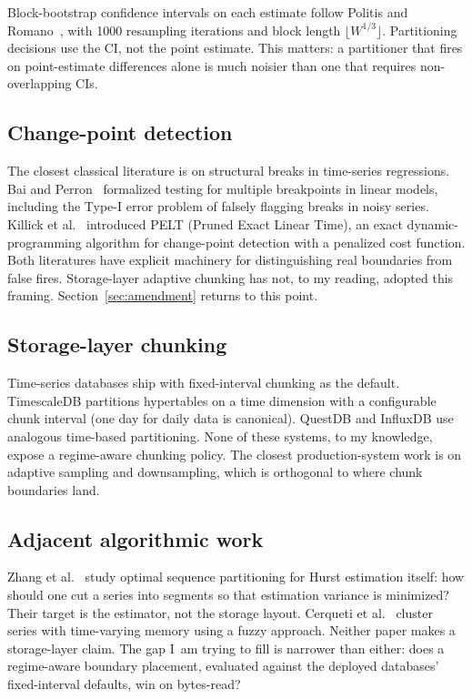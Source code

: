 \documentclass[11pt]{article}
\begin{document}
Block-bootstrap confidence intervals on each estimate follow Politis and Romano~\cite{politisromano1994}, with 1000 resampling iterations and block length $\lfloor W^{1/3}\rfloor$. Partitioning decisions use the CI, not the point estimate. This matters: a partitioner that fires on point-estimate differences alone is much noisier than one that requires non-overlapping CIs.

\subsection{Change-point detection}

The closest classical literature is on structural breaks in time-series regressions. Bai and Perron~\cite{baiperron1998} formalized testing for multiple breakpoints in linear models, including the Type-I error problem of falsely flagging breaks in noisy series. Killick et al.~\cite{killick2012pelt} introduced PELT (Pruned Exact Linear Time), an exact dynamic-programming algorithm for change-point detection with a penalized cost function. Both literatures have explicit machinery for distinguishing real boundaries from false fires. Storage-layer adaptive chunking has not, to my reading, adopted this framing. Section~\ref{sec:amendment} returns to this point.

\subsection{Storage-layer chunking}

Time-series databases ship with fixed-interval chunking as the default. TimescaleDB partitions hypertables on a time dimension with a configurable chunk interval (one day for daily data is canonical). QuestDB and InfluxDB use analogous time-based partitioning. None of these systems, to my knowledge, expose a regime-aware chunking policy. The closest production-system work is on adaptive sampling and downsampling, which is orthogonal to where chunk boundaries land.

\subsection{Adjacent algorithmic work}

Zhang et al.~\cite{zhang2023partitioning} study optimal sequence partitioning for Hurst estimation itself: how should one cut a series into segments so that estimation variance is minimized? Their target is the estimator, not the storage layout. Cerqueti et al.~\cite{cerqueti2022fuzzy} cluster series with time-varying memory using a fuzzy approach. Neither paper makes a storage-layer claim. The gap I~am trying to fill is narrower than either: does a regime-aware boundary placement, evaluated against the deployed databases' fixed-interval defaults, win on bytes-read?
\end{document}

